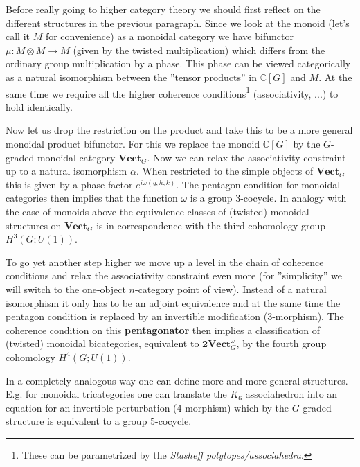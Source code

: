 	Before really going to higher category theory we should first reflect on the different structures in the previous paragraph. Since we look at the monoid (let's call it $M$ for convenience) as a monoidal category we have bifunctor $\mu:M\otimes M\rightarrow M$ (given by the twisted multiplication) which differs from the ordinary group multiplication by a phase. This phase can be viewed categorically as a natural isomorphism between the ''tensor products'' in $\mathbb{C}[G]$ and $M$. At the same time we require all the higher coherence conditions\footnote{These can be parametrized by the \textit{Stasheff polytopes/associahedra}.} (associativity, ...) to hold identically.
	
	Now let us drop the restriction on the product and take this to be a more general monoidal product bifunctor. For this we replace the monoid $\mathbb{C}[G]$ by the $G$-graded monoidal category $\textbf{Vect}_G$. Now we can relax the associativity constraint up to a natural isomorphism $\alpha$. When restricted to the simple objects of $\textbf{Vect}_G$ this is given by a phase factor $e^{i\omega(g, h, k)}$. The pentagon condition for monoidal categories then implies that the function $\omega$ is a group 3-cocycle. In analogy with the case of monoids above the equivalence classes of (twisted) monoidal structures on $\textbf{Vect}_G$ is in correspondence with the third cohomology group $H^3(G; U(1))$.
	
	To go yet another step higher we move up a level in the chain of coherence conditions and relax the associativity constraint even more (for ''simplicity'' we will switch to the one-object $n$-category point of view). Instead of a natural isomorphism it only has to be an adjoint equivalence and at the same time the pentagon condition is replaced by an invertible modification (3-morphism). The coherence condition on this \textbf{pentagonator} then implies a classification of (twisted) monoidal bicategories, equivalent to $\textbf{2Vect}_G^\omega$, by the fourth group cohomology $H^4(G; U(1))$.
	
	In a completely analogous way one can define more and more general structures. E.g. for monoidal tricategories one can translate the $K_6$ associahedron into an equation for an invertible perturbation (4-morphism) which by the $G$-graded structure is equivalent to a group 5-cocycle.

